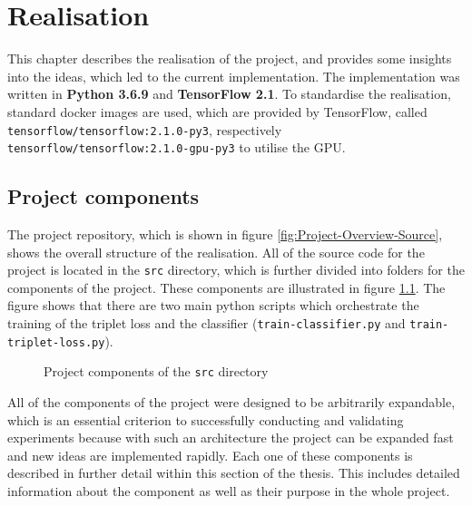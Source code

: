 \chapter{Realisation}
\label{ch:Realisation}
This chapter describes the realisation of the project, and provides some insights into the ideas, which led to the current implementation. The implementation was written in \textbf{Python 3.6.9} and \textbf{TensorFlow 2.1}. To standardise the realisation, standard docker images are used, which are provided by TensorFlow, called \texttt{tensorflow/tensorflow:2.1.0-py3}, respectively \texttt{tensorflow/tensorflow:2.1.0-gpu-py3} to utilise the GPU.

\section{Project components}
\label{sec:Project-Components}
The project repository, which is shown in figure \ref{fig:Project-Overview-Source}, shows the overall structure of the realisation. All of the source code for the project is located in the \texttt{src} directory, which is further divided into folders for the components of the project. These components are illustrated in figure \ref{sec:Project-Components}. The figure shows that there are two main python scripts which orchestrate the training of the triplet loss and the classifier (\texttt{train-classifier.py} and \texttt{train-triplet-loss.py}). 

\begin{figure}[ht]
\caption{Project components of the \texttt{src} directory}
\label{fig:Project-Components}
\end{figure}
\noindent
All of the components of the project were designed to be arbitrarily expandable, which is an essential criterion to successfully conducting and validating experiments because with such an architecture the project can be expanded fast and new ideas are implemented rapidly.
\newline
\newline
Each one of these components is described in further detail within this section of the thesis. This includes detailed information about the component as well as their purpose in the whole project.

